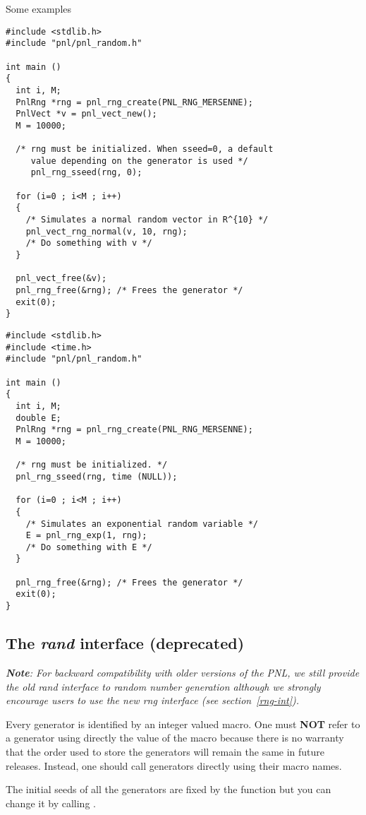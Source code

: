 Some examples
\begin{verbatim}
#include <stdlib.h>
#include "pnl/pnl_random.h"

int main ()
{
  int i, M;
  PnlRng *rng = pnl_rng_create(PNL_RNG_MERSENNE);
  PnlVect *v = pnl_vect_new();
  M = 10000;

  /* rng must be initialized. When sseed=0, a default 
     value depending on the generator is used */
     pnl_rng_sseed(rng, 0);

  for (i=0 ; i<M ; i++)
  {
    /* Simulates a normal random vector in R^{10} */
    pnl_vect_rng_normal(v, 10, rng);
    /* Do something with v */
  }

  pnl_vect_free(&v);
  pnl_rng_free(&rng); /* Frees the generator */
  exit(0);
}
\end{verbatim}

\begin{verbatim}
#include <stdlib.h>
#include <time.h>
#include "pnl/pnl_random.h"

int main ()
{
  int i, M;
  double E;
  PnlRng *rng = pnl_rng_create(PNL_RNG_MERSENNE);
  M = 10000;

  /* rng must be initialized. */
  pnl_rng_sseed(rng, time (NULL));

  for (i=0 ; i<M ; i++)
  {
    /* Simulates an exponential random variable */
    E = pnl_rng_exp(1, rng);
    /* Do something with E */
  }

  pnl_rng_free(&rng); /* Frees the generator */
  exit(0);
}
\end{verbatim}

\subsection{The {\em rand} interface (deprecated)}
\label{rand-int}

{\itshape 
\textbf{Note}:
For backward compatibility with older versions of the PNL, we still provide the old
{\em rand} interface to random number generation although we strongly encourage users
to use the new {\em rng} interface (see section~\ref{rng-int}).
}

Every generator is identified by an integer valued macro. One must {\bf NOT} refer
to a generator using directly the value of the macro  because there
is no warranty that the order used to store the generators will remain the same in
future releases.  Instead, one should call generators directly using their macro
names.

The initial seeds of all the generators are fixed by the function
 but you can change it by calling .

